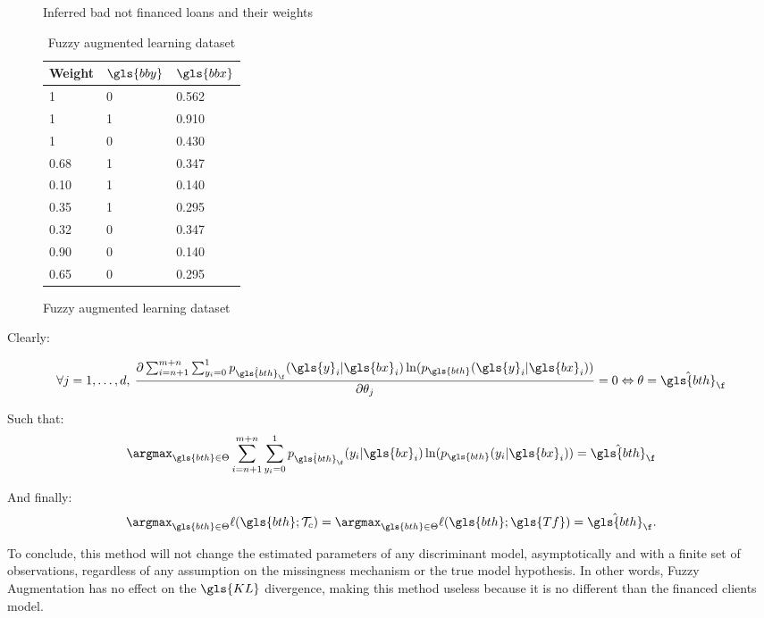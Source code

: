 \begin{table}
{\begin{multicols}{4}
\begin{subfigure}[t]{0.22\textwidth}
\caption{Inferred bad not financed loans and their weights}
\label{fuzzy:sfig3}
\end{subfigure}

\columnbreak

\begin{subfigure}[t]{0.22\textwidth}
\begin{center}
\begin{adjustbox}{max width=0.95\textwidth}
\begin{tabular}{l l l}
\toprule
\textbf{Weight} & \textbf{${\gls{bby}}$} & \textbf{${\gls{bbx}}$}\\
\midrule
1 & 0 & 0.562 \\
1 & 1 & 0.910 \\
1 & 0 & 0.430 \\
0.68 & 1 & 0.347 \\
0.10 & 1 & 0.140 \\
0.35 & 1 & 0.295 \\
0.32 & 0 & 0.347 \\
0.90 & 0 & 0.140 \\
0.65 & 0 & 0.295 \\
\bottomrule
\end{tabular}
\end{adjustbox}
\end{center}
\caption{Fuzzy augmented learning dataset}
\label{fuzzy:sfig4}
\end{subfigure}

\end{multicols}
}
\end{table}

 Clearly:

 \[ \forall j = 1, \ldots, d, \: \frac{\partial \sum_{i=n+1}^{m+n} \sum_{y_i = 0}^{1} p_{\hat{\gls{bth}}_\f}(\gls{y}_i| \gls{bx}_i)\ln (p_{\gls{bth}}(\gls{y}_i| \gls{bx}_i))}{\partial \theta_j} = 0 \Leftrightarrow \theta = \hat{\gls{bth}}_{\f} \]

 Such that:
 \[\argmax_{\gls{bth} \in \Theta}  \sum_{i=n+1}^{m+n} \sum_{y_i = 0}^{1} p_{\hat{\gls{bth}}_{\f}}(y_i| \gls{bx}_i)\ln (p_{\gls{bth}}(y_i| \gls{bx}_i)) = \hat{\gls{bth}}_{\f}\]

 And finally:
 \[\argmax_{\gls{bth} \in \Theta} \ell(\gls{bth};\mathcal{T}_{c}) = \argmax_{\gls{bth} \in \Theta} \ell(\gls{bth};\gls{Tf}) = \hat{\gls{bth}}_{\f}. \]

 To conclude, this method will not change the estimated parameters of any discriminant model, asymptotically and with a finite set of observations, regardless of any assumption on the missingness mechanism or the true model hypothesis. In other words, Fuzzy Augmentation has no effect on the $\gls{KL}$ divergence, making this method useless because it is no different than the financed clients model.


